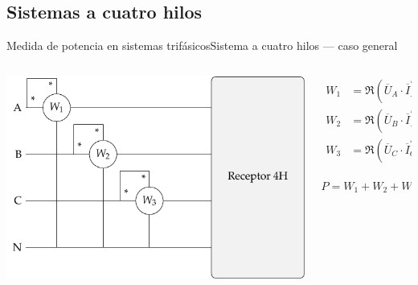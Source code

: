 \documentclass[aspectratio=169, xcolor={usenames,svgnames,dvipsnames}]{beamer}
\begin{document}
\subsection{Sistemas a cuatro hilos}
\begin{frame}{Medida de potencia en sistemas trifásicos}{Sistema a cuatro hilos --- caso general}
\begin{columns}
\begin{column}{0.7\columnwidth}
\begin{center}
\includegraphics[height=0.75\textheight]{../figs/Potencia4H.pdf}
\end{center}
\end{column}

\begin{column}{0.3\columnwidth}
\begin{align*}
  W_1 &= \Re(\overline{U}_A \cdot \overline{I}_A^*) = P_A\\
  W_2 &= \Re(\overline{U}_B \cdot \overline{I}_B^*) = P_B\\
  W_3 &= \Re(\overline{U}_C \cdot \overline{I}_C^*) = P_C\\
\end{align*}

\[
  \boxed{P = W_1 + W_2 + W_3}
\]
\end{column}
\end{columns}
\end{frame}
\end{document}
